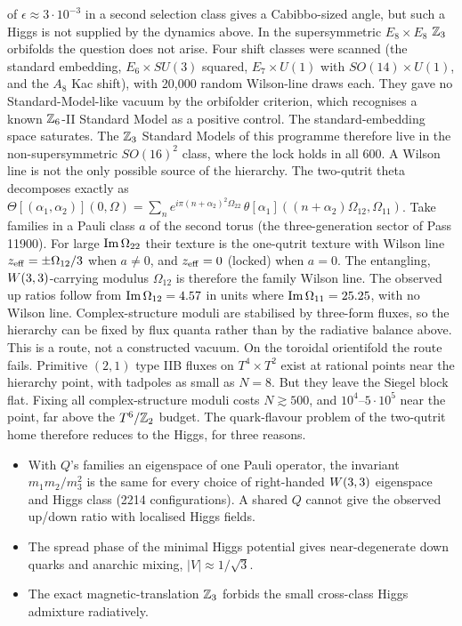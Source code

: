of $\epsilon\approx3\cdot10^{-3}$ in a second selection class gives a Cabibbo-sized angle, but such a Higgs is not
supplied by the dynamics above. 
In the supersymmetric $E_8\times E_8$ $\mathbb{Z}_3$ orbifolds the question does not arise. Four shift classes were scanned
(the standard embedding, $E_6\times SU(3)$ squared, $E_7\times U(1)$ with $SO(14)\times U(1)$, and the $A_8$ Kac shift),
with 20{,}000 random Wilson-line draws each. They gave no Standard-Model-like vacuum by the orbifolder criterion, which
recognises a known $\mathbb{Z}_6$-II Standard Model as a positive control. The standard-embedding space saturates. The $\mathbb{Z}_3$
Standard Models of this programme therefore live in the non-supersymmetric $SO(16)^2$ class, where the lock holds in
all 600. 
A Wilson line is not the only possible source of the hierarchy. The two-qutrit theta decomposes exactly as
$\Theta[(\alpha_1,\alpha_2)](0,\Omega)=\sum_n e^{i\pi(n+\alpha_2)^2\Omega_{22}}\,
\theta[\alpha_1]((n+\alpha_2)\Omega_{12},\Omega_{11})$. Take families in a Pauli class $a$ of the second torus (the
three-generation sector of Pass 11900). For large ${\rm Im}\,\Omega_{22}$ their texture is the one-qutrit texture with
Wilson line $z_{\rm eff}=\pm\Omega_{12}/3$ when $a\neq0$, and $z_{\rm eff}=0$ (locked) when $a=0$. The entangling,
$W(3,3)$-carrying modulus $\Omega_{12}$ is therefore the family Wilson line. The observed up ratios follow from
${\rm Im}\,\Omega_{12}=4.57$ in units where ${\rm Im}\,\Omega_{11}=25.25$, with no Wilson line. Complex-structure moduli
are stabilised by three-form fluxes, so the hierarchy can be fixed by flux quanta rather than by the radiative balance
above. This is a route, not a constructed vacuum. 
On the toroidal orientifold the route fails. Primitive $(2,1)$ type IIB fluxes on $T^4\times T^2$ exist at rational
points near the hierarchy point, with tadpoles as small as $N=8$. But they leave the Siegel block flat. Fixing all
complex-structure moduli costs $N\gtrsim500$, and $10^4$--$5\cdot10^5$ near the point, far above the $T^6/\mathbb{Z}_2$ budget.
The quark-flavour problem of the two-qutrit home therefore reduces to the Higgs, for three reasons.
\begin{itemize}
\item With $Q$'s families an eigenspace of one Pauli operator, the invariant $m_1m_2/m_3^2$ is the same for every
choice of right-handed $W(3,3)$ eigenspace and Higgs class (2214 configurations). A shared $Q$ cannot give the observed
up/down ratio with localised Higgs fields.
\item The spread phase of the minimal Higgs potential gives near-degenerate down quarks and anarchic mixing,
$|V|\approx1/\sqrt3$.
\item The exact magnetic-translation $\mathbb{Z}_3$ forbids the small cross-class Higgs admixture radiatively.
\end{itemize}
